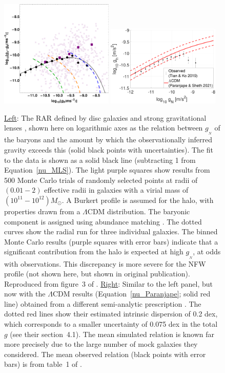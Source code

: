 \documentclass[fleqn,usenatbib,useAMS,onecolumn]{mnras} %
\begin{document}
\begin{figure}
	\centering
	\includegraphics[width=0.48\textwidth]{Tian_2019_Figure_3_AUTHOR_Burkert_HAR}
	\hfill
	\includegraphics[width=0.48\textwidth]{Halo_acceleration_comparison}
	\caption{\underline{Left}: The RAR defined by disc galaxies and strong gravitational lenses \citep[Section~\ref{Strong_lensing}; see also][]{Tian_2017}, shown here on logarithmic axes as the relation between $g_{_N}$ of the baryons and the amount by which the observationally inferred gravity exceeds this (solid black points with uncertainties). The fit to the data is shown as a solid black line (subtracting 1 from Equation~\ref{nu_MLS}). The light purple squares show results from 500 Monte Carlo trials of randomly selected points at radii of $\left(0.01-2\right)$ effective radii in galaxies with a virial mass of $\left(10^{11} - 10^{12}\right) M_\odot$. A Burkert profile is assumed for the halo, with properties drawn from a $\Lambda$CDM distribution. The baryonic component is assigned using abundance matching \citep{Behroozi_2013_AM}. The dotted curves show the radial run for three individual galaxies. The binned Monte Carlo results (purple squares with error bars) indicate that a significant contribution from the halo is expected at high $g_{_N}$, at odds with observations. This discrepancy is more severe for the NFW profile (not shown here, but shown in original publication). Reproduced from figure~3 of \citet{Tian_2019}. \underline{Right}: Similar to the left panel, but now with the $\Lambda$CDM results (Equation~\ref{nu_Paranjape}; solid red line) obtained from a different semi-analytic prescription \citep{Paranjape_2021}. The dotted red lines show their estimated intrinsic dispersion of 0.2 dex, which corresponds to a smaller uncertainty of 0.075 dex in the total $g$ (see their section~4.1). The mean simulated relation is known far more precisely due to the large number of mock galaxies they considered. The mean observed relation (black points with error bars) is from table~1 of \citet{Tian_2019}.}
	\label{Tian_2019_Figure_3}
\end{figure}
\end{document}
